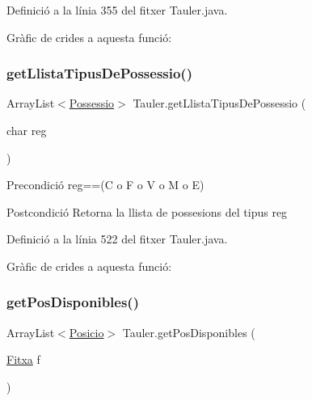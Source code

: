 Definició a la línia 355 del fitxer Tauler.\+java.

Gràfic de crides a aquesta funció\+:
\mbox{\label{class_tauler_afcb2ec44c6e489651e68990a1e65cb49}} 
\subsubsection{\texorpdfstring{get\+Llista\+Tipus\+De\+Possessio()}{getLlistaTipusDePossessio()}}
{\footnotesize\ttfamily Array\+List$<$\mbox{\hyperlink{class_possessio}{Possessio}}$>$ Tauler.\+get\+Llista\+Tipus\+De\+Possessio (\begin{DoxyParamCaption}\item[{char}]{reg }\end{DoxyParamCaption})\hspace{0.3cm}{\ttfamily [private]}}

\begin{DoxyPrecond}{Precondició}
reg==(\textquotesingle{}C\textquotesingle{} o \textquotesingle{}F\textquotesingle{} o \textquotesingle{}V\textquotesingle{} o \textquotesingle{}M\textquotesingle{} o \textquotesingle{}E\textquotesingle{}) 
\end{DoxyPrecond}
\begin{DoxyPostcond}{Postcondició}
Retorna la llista de possesions del tipus reg 
\end{DoxyPostcond}


Definició a la línia 522 del fitxer Tauler.\+java.

Gràfic de crides a aquesta funció\+:
\mbox{\label{class_tauler_af4c6190c83c0a48f83b08f8892fd3413}} 
\subsubsection{\texorpdfstring{get\+Pos\+Disponibles()}{getPosDisponibles()}}
{\footnotesize\ttfamily Array\+List$<$\mbox{\hyperlink{class_posicio}{Posicio}}$>$ Tauler.\+get\+Pos\+Disponibles (\begin{DoxyParamCaption}\item[{\mbox{\hyperlink{class_fitxa}{Fitxa}}}]{f }\end{DoxyParamCaption})}

